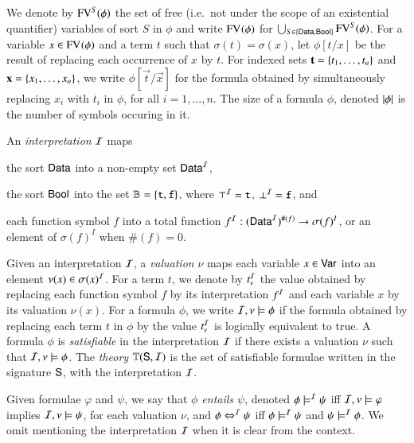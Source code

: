 \documentclass{llncs}
\begin{document}
We denote by $\mathrm{FV}^{S}(\phi)$ the set of free (i.e.\ not under the scope
of an existential quantifier) variables of sort $S$ in $\phi$ and
write $\mathrm{FV}^{}(\phi)$ for $\bigcup_{S \in \left\{ \mathsf{Data},\mathsf{Bool} \right\}}
\mathrm{FV}^{S}(\phi)$. For a variable $x \in \mathrm{FV}^{}(\phi)$ and a term $t$ such
that $\sigma(t) = \sigma(x)$, let $\phi[t/x]$ be the result of
replacing each occurrence of $x$ by $t$. For indexed sets
$\mathbf t=\left\{ t_1,\ldots,t_n \right\}$ and $\mathbf x=\left\{ x_1,\ldots,x_n \right\}$, we
write $\phi[\vec{t}/\vec{x}]$ for the formula obtained by
simultaneously replacing $x_i$ with $t_i$ in $\phi$, for all
$i=1,\ldots,n$.
%
%
The size of a formula $\phi$, denoted ${|{\phi}|}$ is the number of
symbols occuring in it.

An \emph{interpretation} $\mathcal{I}$ maps\begin{inparaenum}[(1)]
\item the sort $\mathsf{Data}$ into a non-empty set $\mathsf{Data}^{\mathcal{I}}$, 
%
\item the sort $\mathsf{Bool}$ into the set $\mathbb{B} = \left\{ \mathtt{t},\mathtt{f} \right\}$, where
  $\top^{\mathcal{I}} = \mathtt{t}$, $\bot^{\mathcal{I}} = \mathtt{f}$, and
%
\item each function symbol $f$ into a total function $f^{\mathcal{I}} :
  (\mathsf{Data}^{\mathcal{I}})^{\#(f)} \rightarrow \sigma(f)^I$, or an element of
  $\sigma(f)^I$ when $\#(f)=0$.
\end{inparaenum}
Given an interpretation $\mathcal{I}$, a \emph{valuation} $\nu$ maps each
variable $x \in \mathsf{Var}$ into an element $\nu(x) \in \sigma(x)^{\mathcal{I}}$. For
a term $t$, we denote by $t^{\mathcal{I}}_\nu$ the value obtained by replacing
each function symbol $f$ by its interpretation $f^{\mathcal{I}}$ and each
variable $x$ by its valuation $\nu(x)$. For a formula $\phi$, we write
$\mathcal{I},\nu \models \phi$ if the formula obtained by replacing each term
$t$ in $\phi$ by the value $t^{\mathcal{I}}_\nu$ is logically equivalent to true.
A formula $\phi$ is \emph{satisfiable} in the interpretation $\mathcal{I}$ if
there exists a valuation $\nu$ such that $\mathcal{I},\nu \models \phi$. The
\emph{theory} $\mathbb{T}(\mathsf{S},\mathcal{I})$ is the set of satisfiable formulae
written in the signature $\mathsf{S}$, with the interpretation $\mathcal{I}$. 

Given formulae $\varphi$ and $\psi$, we say that \emph{$\phi$ entails
  $\psi$}, denoted $\phi \models^{\mathcal{I}} \psi$ iff $\mathcal{I},\nu \models \varphi$
implies $\mathcal{I},\nu \models \psi$, for each valuation $\nu$, and $\phi
\Leftrightarrow^{\mathcal{I}} \psi$ iff $\phi \models^{\mathcal{I}} \psi$ and $\psi \models^{\mathcal{I}} \phi$.
We omit mentioning the interpretation $\mathcal{I}$ when it is clear from the
context.
\end{document}
